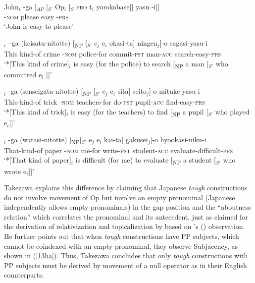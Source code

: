 \documentclass[output=paper,colorlinks,citecolor=brown,
]{langscibook}
\begin{document}
\begin{exe}
\ex \label{11ha}
\gll John$_{i}$ -ga [$_{AP}$ [$_{S’}$ Op$_{i}$ [$_{S}$ \textsc{pro} t$_{i}$ yorokobase]] yasu -i]]\\
{} -\textsc{nom} {} {} {} {} {} {} please easy -\textsc{prs}\\
\glt ‘John is easy to please’

\ex \label{12ha}
\begin{xlist}
\ex \label{12aha}
$_{i}$ –ga (keisatu-nitotte) [\textsubscript{NP} [$_{S’}$ e$_{j}$ e$_{i}$ okasi-ta] ningen$_{j}$]-o  sagasi-yasu-i\\
This kind-of crime -\textsc{nom} police-for {} {} {} {} commit-\textsc{pst} man-\textsc{acc} search-easy-\textsc{prs}\\
\glt `*[This kind of crime]$_{i}$ is easy (for the police) to search [\textsubscript{NP} a man [$_{S'}$ who committed e$_{i}$ ]]'

\ex \label{12bha}
$_{i}$ -ga (senseigata-nitotte) [\textsubscript{NP} [$_{S'}$ e$_{j}$ e$_{i}$ sita] seito$_{j}$]-o    mituke-yasu-i\\
This-kind-of trick -\textsc{nom} teachers-for {} {} {} {} do-\textsc{pst} pupil-\textsc{acc} find-easy-\textsc{prs}\\
\glt `*[This kind of trick]$_{i}$ is easy (for the teachers) to find [\textsubscript{NP} a pupil [$_{S'}$ who played e$_{i}$]]'



\ex \label{12cha}
$_{i}$ -ga (watasi-nitotte) [\textsubscript{NP}[$_{S'}$ e$_{j}$ e$_{i}$ kai-ta] gakusei$_{j}$]-o  hyookasi-niku-i\\
That-kind-of paper  -\textsc{nom}  me-for  {} {} {}   write-\textsc{pst} student-\textsc{acc} evaluate-difficult-\textsc{prs}\\
\glt `*[That kind of paper]$_{i}$ is difficult (for me) to evaluate [\textsubscript{NP} a student [$_{S'}$ who wrote e$_{i}$]]’ \hspace{30mm} \citep[203]{takezawa1987}                   
\end{xlist}
\end{exe}

Takezawa explains this difference by claiming that Japanese \textit{tough} constructions do not involve movement of Op but involve an empty pronominal (Japanese independently allows empty pronominals) in the gap position and the “aboutness relation” which correlates the pronominal and its antecedent, just as claimed for the derivation of relativization and topicalization by \citet{Saito1985} based on \citeauthor{kuno1973}’s (\citeyear{kuno1973}) observation. He further points out that when \textit{tough} constructions have PP subjects, which cannot be coindexed with an empty pronominal, they observe Subjacency, as shown in (\ref{13ha}). Thus, Takezawa concludes that only \textit{tough} constructions with PP subjects must be derived by movement of a null operator as in their English counterparts.
\end{document}
